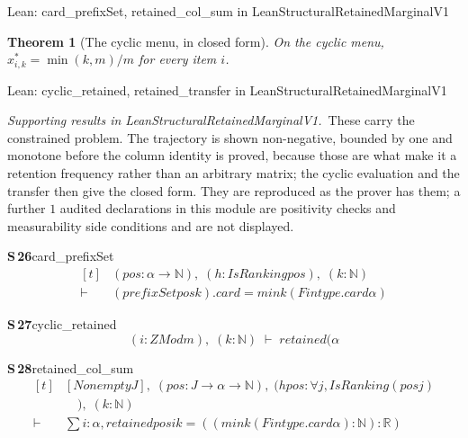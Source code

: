 \documentclass[conference]{IEEEtran}
\newtheorem{theorem}{Theorem}
\theoremstyle{definition}
\newcommand{\lean}[1]{\textsf{\footnotesize #1}}
\newcommand{\leanbox}[1]{%
  \par\vspace{2pt}\noindent
  {\footnotesize\textsf{Lean: #1}}\par\vspace{2pt}}
\begin{document}
\leanbox{\lean{card\_prefixSet}, \lean{retained\_col\_sum} in
\lean{LeanStructuralRetainedMarginalV1}}

\begin{theorem}[The cyclic menu, in closed form]
\label{thm:cyclic}
On the cyclic menu, $x^{*}_{i,k}=\min(k,m)/m$ for every item $i$.
\end{theorem}

\leanbox{\lean{cyclic\_retained}, \lean{retained\_transfer} in
\lean{LeanStructuralRetainedMarginalV1}}

\noindent\emph{Supporting results in \lean{LeanStructuralRetainedMarginalV1}.}~These carry the constrained problem. The trajectory is shown non-negative, bounded by one and monotone before the column identity is proved, because those are what make it a retention frequency rather than an arbitrary matrix; the cyclic evaluation and the transfer then give the closed form. They are reproduced as the prover has them; a further $1$ audited declarations in this module are positivity checks and measurability side conditions and are not displayed.

\noindent\textbf{S\,26}\quad\lean{card\_prefixSet}
{\footnotesize\[ \begin{aligned}[t]
&(\mathit{pos} : \alpha \to \mathbb{N} ),\; (\mathit{h} : \mathit{IsRanking} \mathit{pos}),\; (\mathit{k} : \mathbb{N} )\\
\vdash\;&(\mathit{prefixSet} \mathit{pos} \mathit{k}).\mathit{card} = \mathit{min} \mathit{k} (\mathit{Fintype}.\mathit{card} \alpha )
\end{aligned} \]}

\noindent\textbf{S\,27}\quad\lean{cyclic\_retained}
{\footnotesize\[ (\mathit{i} : \mathit{ZMod} \mathit{m}),\; (\mathit{k} : \mathbb{N} ) \;\vdash\; \mathit{retained} (\alpha \]}

\noindent\textbf{S\,28}\quad\lean{retained\_col\_sum}
{\footnotesize\[ \begin{aligned}[t]
&[\mathit{Nonempty} \mathit{J}],\; (\mathit{pos} : \mathit{J} \to \alpha \to \mathbb{N} ),\; (\mathit{hpos} : \forall \mathit{j}, \mathit{IsRanking} (\mathit{pos} \mathit{j})\\
&\quad ),\; (\mathit{k} : \mathbb{N} )\\
\vdash\;&\textstyle\sum \mathit{i} : \alpha , \mathit{retained} \mathit{pos} \mathit{i} \mathit{k} = ((\mathit{min} \mathit{k} (\mathit{Fintype}.\mathit{card} \alpha ) : \mathbb{N} ) : \mathbb{R} )
\end{aligned} \]}
\end{document}
